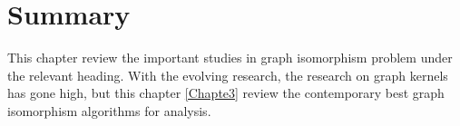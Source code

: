 \section{Summary}
This chapter review the important studies in graph isomorphism problem under the relevant heading. With the evolving research, the research on graph kernels has gone high, but this chapter \ref{Chapte3} review the contemporary best graph isomorphism algorithms for analysis.


